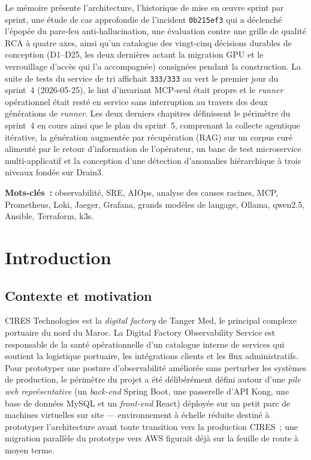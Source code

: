 \documentclass[11pt,a4paper,oneside]{report}
\begin{document}
Le mémoire présente l'architecture, l'historique de mise en \oe{}uvre
sprint par sprint, une étude de cas approfondie de l'incident
\texttt{0b215ef3} qui a déclenché l'épopée du pare-feu
anti-hallucination, une évaluation contre une grille de qualité RCA
à quatre axes, ainsi qu'un catalogue des vingt-cinq décisions
durables de conception (D1--D25, les deux dernières actant la
migration GPU et le verrouillage d'accès qui l'a accompagnée)
consignées pendant la construction. La suite de tests du service de
tri affichait \texttt{333/333} au vert le premier jour du sprint~4
(2026-05-25), le lint d'invariant MCP-seul était propre et le
\emph{runner} opérationnel était resté en service sans interruption
au travers des deux générations de \emph{runner}. Les deux derniers
chapitres définissent le périmètre du sprint~4 en cours ainsi que le
plan du sprint~5, comprenant la collecte agentique itérative, la
génération augmentée par récupération (RAG) sur un corpus curé
alimenté par le retour d'information de l'opérateur, un banc de test
microservice multi-applicatif et la conception d'une détection
d'anomalies hiérarchique à trois niveaux fondée sur Drain3.

\vspace{1em}
\noindent\textbf{Mots-clés~:} observabilité, SRE, AIOps, analyse des
causes racines, MCP, Prometheus, Loki, Jaeger, Grafana, grands
modèles de langage, Ollama, qwen2.5, Ansible, Terraform, k3s.

\tableofcontents
\listoffigures
\listoftables

\chapter{Introduction}
\label{ch:intro}

\section{Contexte et motivation}

CIRES Technologies est la \emph{digital factory} de Tanger Med, le
principal complexe portuaire du nord du Maroc. La Digital Factory
Observability Service est responsable de la santé opérationnelle
d'un catalogue interne de services qui soutient la logistique
portuaire, les intégrations clients et les flux administratifs. Pour
prototyper une posture d'observabilité améliorée sans perturber les
systèmes de production, le périmètre du projet a été délibérément
défini autour d'une \emph{pile web représentative} (un \emph{back-end}
Spring Boot, une passerelle d'API Kong, une base de données MySQL et
un \emph{front-end} React) déployée sur un petit parc de machines
virtuelles sur site --- environnement à échelle réduite destiné à
prototyper l'architecture avant toute transition vers la production
CIRES~; une migration parallèle du prototype vers AWS figurait déjà
sur la feuille de route à moyen terme.
\end{document}
